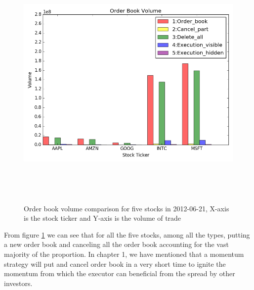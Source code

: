 \begin{figure} [hp]
  \begin{center}
    \includegraphics[width=6in,  height=5in]{figures/order_book_volume.png}
  \end{center}
\caption{Order book volume comparison for five stocks in 2012-06-21,    X-axis is the stock ticker and Y-axis is the volume of trade} \label{fig:order_book_volume}
\end{figure}

From figure \ref{fig:order_book_volume} we can see that for all the five stocks,   among all the types,   putting a new order book and canceling all the order book accounting for the vast majority of the proportion. In chapter 1,   we have mentioned that a momentum strategy will put and cancel order book in a very short time to ignite the momentum from which the executor can beneficial from the spread by other investors.

